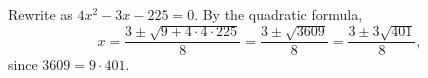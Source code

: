 Rewrite as $4x^2-3x-225=0$. By the quadratic formula,
\[x=\dfrac{3\pm\sqrt{9+4\cdot4\cdot225}}{8}=\dfrac{3\pm\sqrt{3609}}{8}=\boxed{\dfrac{3\pm3\sqrt{401}}{8}},\]
since $3609=9\cdot401$.
